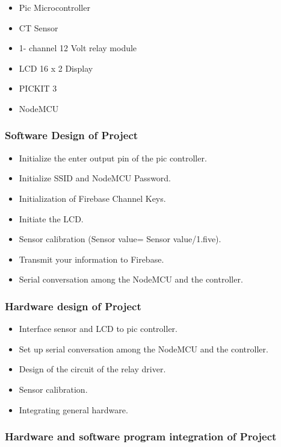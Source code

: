 \documentclass[12pt,a4paper]{article}
\begin{document}
\begin{itemize}
	\item Pic Microcontroller 
	\item  CT Sensor 
	\item 1- channel 12 Volt relay module 
	\item LCD 16 x 2 Display
	\item PICKIT 3
	\item NodeMCU 
\end{itemize}

\pagebreak
\subsubsection{Software Design of Project}

\begin{itemize}
	\item Initialize the enter output pin of the pic controller.
	\item Initialize SSID and NodeMCU Password.
	\item Initialization of Firebase Channel Keys.
	\item Initiate the LCD.
	\item Sensor calibration (Sensor value= Sensor value/1.five).
	\item Transmit your information to Firebase.
	\item Serial conversation among the NodeMCU and the controller.
\end{itemize}

\subsubsection{Hardware design of Project}

\begin{itemize}
	\item Interface sensor and LCD  to pic controller.
	\item Set up serial conversation among the NodeMCU and the controller. 
	\item Design of the circuit of the relay driver.
	\item Sensor calibration.
	\item Integrating general hardware.
\end{itemize}

\subsubsection{Hardware and software program integration of Project}
\end{document}
